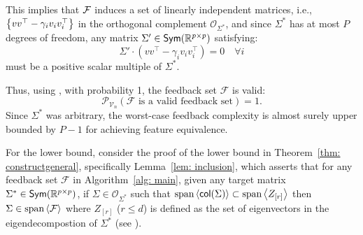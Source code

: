 This implies that ${\mathcal{F}}$ induces a set of linearly independent matrices, i.e., $\left\{vv^{\top} - \gamma_{i}v_iv_i^{\top}\right\}$ in the orthogonal complement $\mathcal{O}_{\Sigma^*}$, and since \( \Sigma^* \) has at most \( P \) degrees of freedom, any matrix \( \Sigma' \in \textsf{Sym}(\mathbb{R}^{p\times p}) \) satisfying:
\[
\Sigma' \cdot \left(v v^{\top} - \gamma_i v_i v_i^{\top}\right) = 0 \quad \forall i
\]
must be a positive scalar multiple of \( \Sigma^* \).

Thus, using ,  with probability 1, the feedback set \( \mathcal{F} \) is valid:
\[
\mathcal{P}_{\mathcal{V}_n}\left(\mathcal{F} \text{ is a valid feedback set}\right) = 1.
\]
Since \( \Sigma^* \) was arbitrary, the worst-case feedback complexity is almost surely upper bounded by \( P - 1 \) for achieving feature equivalence.

For the lower bound, consider the proof of the lower bound in Theorem~\ref{thm: constructgeneral}, specifically Lemma~\ref{lem: inclusion}, which asserts that for any feedback set \( \mathcal{F} \) in Algorithm~\ref{alg: main}, given any target matrix $\Sigma^* \in \textsf{Sym}(\mathbb{R}^{p\times p})$, if $\Sigma \in \mathcal{O}_{\Sigma^*}$ such that $\text{span}\left<\textsf{col}({\Sigma})\right> \subset \text{span} \left<Z_{\left[r\right]}\right>$ then $\Sigma \in \text{span} \left<{\mathcal{F}}\right>$ where $Z_{[r]}$ ($r \le d$) is defined as the set of eigenvectors in the eigendecompostion of $\Sigma^*$ (see ).%

